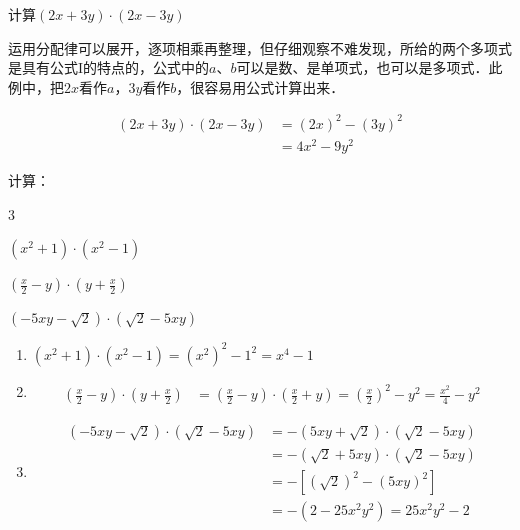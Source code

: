 \begin{example}
    计算$(2x+3y)\cdot(2x-3y)$
\end{example}

\begin{analyze}
    运用分配律可以展开，逐项相乘再整理，但仔细观察不难发现，所给的两个多项式是具有公式I的特点的，公式中的$a$、$b$可以是数、是单项式，也可以是多项式．此例中，把$2x$看作$a$，$3y$看作$b$，很容易用公式计算出来．
\end{analyze}

\begin{solution}
    \[\begin{split}
        (2x+3y)\cdot(2x-3y)&=(2x)^2-(3y)^2\\
        &=4x^2-9y^2
    \end{split}\]
\end{solution}

\begin{example}
    计算：
\begin{enumerate}
    \begin{multicols}{3}
         \item $(x^2+1)\cdot (x^2-1)$
    \item $\left(\frac{x}{2}-y\right)\cdot \left(y+\frac{x}{2}\right)$
    \item $\left(-5xy-\sqrt{2}\right)\cdot \left(\sqrt{2}-5xy\right)$
    \end{multicols}
\end{enumerate}
\end{example}

\begin{solution}
\begin{enumerate}
    \item $(x^2+1)\cdot (x^2-1)=(x^2)^2-1^2=x^4-1$
    \item \[\begin{split}
        \left(\frac{x}{2}-y\right)\cdot \left(y+\frac{x}{2}\right)&=\left(\frac{x}{2}-y\right)\cdot \left(\frac{x}{2}+y\right)=\left(\frac{x}{2}\right)^2-y^2=\frac{x^2}{4}-y^2 
    \end{split}\]
    \item \[\begin{split}
    \left(-5xy-\sqrt{2}\right)\cdot \left(\sqrt{2}-5xy\right)&=-\left(5xy+\sqrt{2}\right)\cdot \left(\sqrt{2}-5xy\right)\\
    &=-(\sqrt{2}+5xy)\cdot (\sqrt{2}-5xy)\\
    &=-\left[(\sqrt{2})^2-(5xy)^2\right]\\
    &=-(2-25x^2y^2)=25x^2y^2-2
    \end{split}\]
\end{enumerate}
\end{solution}

